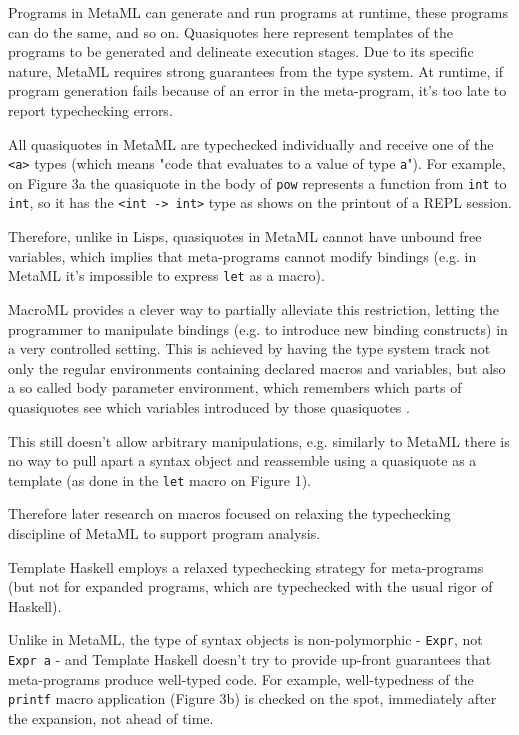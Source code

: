 \documentclass[10pt,journal,a4paper]{IEEEtran}
\begin{document}
Programs in MetaML can generate and run programs at runtime, these programs can do the same, and so on.
Quasiquotes here represent templates of the programs to be generated and delineate execution stages.
Due to its specific nature, MetaML requires strong guarantees from the type system.
At runtime, if program generation fails because of an error in the meta-program,
it's too late to report typechecking errors.

All quasiquotes in MetaML are typechecked individually
and receive one of the \texttt{<a>}
types (which means "code that evaluates to a value of type \texttt{a}").
For example, on Figure 3a the quasiquote in the body of \texttt{pow}
represents a function from \texttt{int} to \texttt{int}, so it has the
\texttt{<int -> int>} type as shows on the printout of a REPL session.

Therefore, unlike in Lisps, quasiquotes in MetaML cannot have unbound
free variables, which implies that meta-programs cannot modify bindings
(e.g. in MetaML it’s impossible to express \texttt{let} as a macro).

MacroML provides a clever way to partially alleviate this restriction, letting
the programmer to manipulate bindings (e.g. to introduce new binding constructs)
in a very controlled setting. This is achieved by having the type system track
not only the regular environments containing declared macros and variables, but also
a so called body parameter environment, which remembers which parts of quasiquotes
see which variables introduced by those quasiquotes \cite{ganz01}.

This still doesn't allow arbitrary manipulations, e.g. similarly to MetaML there is no way
to pull apart a syntax object and reassemble using a quasiquote as a template (as done in the \texttt{let}
macro on Figure 1).

Therefore later research on macros focused on relaxing the typechecking discipline of MetaML
to support program analysis.

Template Haskell \cite{sheard02} employs a relaxed typechecking strategy for meta-programs
(but not for expanded programs, which are typechecked with the usual rigor of Haskell).

Unlike in MetaML, the type of syntax objects is non-polymorphic - \texttt{Expr}, not \texttt{Expr a} -
and Template Haskell doesn't try to provide up-front guarantees that meta-programs produce well-typed code.
For example, well-typedness of the \texttt{printf} macro application (Figure 3b) is checked on the spot,
immediately after the expansion, not ahead of time.
\end{document}
